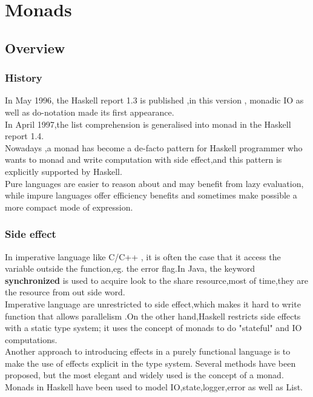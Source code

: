 
\chapter{Monads}
\section{Overview}




\subsection{History}
In May 1996, the Haskell report 1.3 is published ,in this version , monadic IO as well as do-notation made its first appearance.\cite{history} \\

In April 1997,the list comprehension is generalised into monad in the Haskell report 1.4.\cite{history} \\ 

Nowadays ,a monad has become a de-facto pattern for Haskell programmer who wants to monad and write computation with side effect,and this pattern is explicitly supported by Haskell.\\


Pure languages are easier to reason about and may benefit from lazy
evaluation, while impure languages offer efficiency benefits and sometimes make possible a more compact mode of expression.\cite{monads_for}



\subsection{Side effect}
In imperative language like C/C++ , it is often the case that it access the variable outside the function,eg. the error flag.In Java, the keyword \textbf{synchronized} is used to acquire look to the share resource,most of time,they are the resource from out side word.\\

Imperative language are unrestricted to side effect,which makes it hard to write function that allows parallelism .On the other hand,Haskell restricts side effects with a static type system; it uses the concept of monads to do "stateful" and IO computations.\cite{imperative} \\

Another approach to introducing effects in a purely functional language
is to make the use of effects explicit in the type system. Several methods
have been proposed, but the most elegant and widely used is the concept
of a monad.\cite{imperative}  Monads in Haskell have been used to model IO,state,logger,error as well as List.



